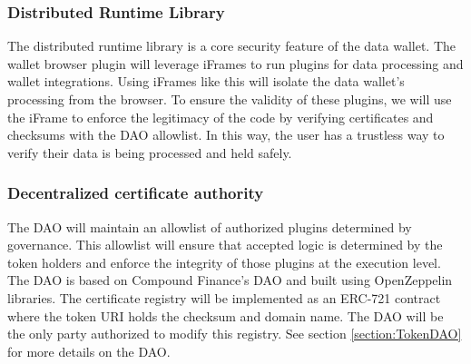 \subsubsection{Distributed Runtime Library}

The distributed runtime library is a core security feature of the data wallet. The wallet browser plugin will leverage iFrames to run plugins for data 
processing and wallet integrations. Using iFrames like this will isolate the data wallet's processing from the browser. To ensure the validity of these 
plugins, we will use the iFrame to enforce the legitimacy of the code by verifying certificates and checksums with the DAO allowlist. In this way, the 
user has a trustless way to verify their data is being processed and held safely.

\subsubsection{Decentralized certificate authority}
\label{section:DAO}
The DAO will maintain an allowlist of authorized plugins determined by governance. This allowlist will ensure that accepted logic is determined by the token 
holders and enforce the integrity of those plugins at the execution level. The DAO is based on Compound Finance's DAO and built using OpenZeppelin libraries. 
The certificate registry will be implemented as an ERC-721 contract where the token URI holds the checksum and domain name. The DAO will be the only party 
authorized to modify this registry. See section \ref{section:TokenDAO} for more details on the DAO.

